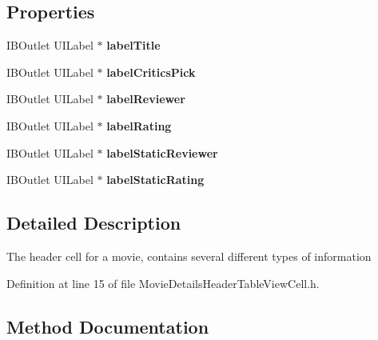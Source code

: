 \subsection*{Properties}
\begin{DoxyCompactItemize}
\item 
I\+B\+Outlet U\+I\+Label $\ast$ {\bfseries label\+Title}\label{interface_movie_details_header_table_view_cell_a4d47d31eb0705193fb9d6afb58f66496}

\item 
I\+B\+Outlet U\+I\+Label $\ast$ {\bfseries label\+Critics\+Pick}\label{interface_movie_details_header_table_view_cell_af1f153025d20634db329b39519471a0a}

\item 
I\+B\+Outlet U\+I\+Label $\ast$ {\bfseries label\+Reviewer}\label{interface_movie_details_header_table_view_cell_a114563761be5c915b09fa97f4370d55f}

\item 
I\+B\+Outlet U\+I\+Label $\ast$ {\bfseries label\+Rating}\label{interface_movie_details_header_table_view_cell_a03827a65fc595d012e2242990c2a20f0}

\item 
I\+B\+Outlet U\+I\+Label $\ast$ {\bfseries label\+Static\+Reviewer}\label{interface_movie_details_header_table_view_cell_ac60cb2ec0719ae402fc230548012bea8}

\item 
I\+B\+Outlet U\+I\+Label $\ast$ {\bfseries label\+Static\+Rating}\label{interface_movie_details_header_table_view_cell_a07a1b5be594814c07af80414b0186820}

\end{DoxyCompactItemize}


\subsection{Detailed Description}
The header cell for a movie, contains several different types of information 

Definition at line 15 of file Movie\+Details\+Header\+Table\+View\+Cell.\+h.



\subsection{Method Documentation}
